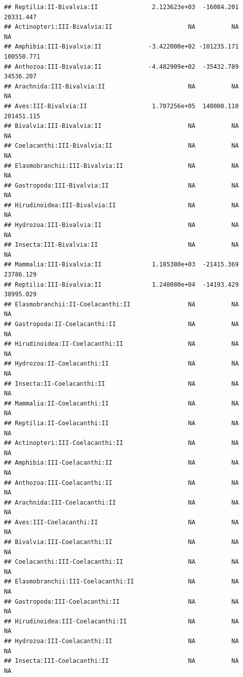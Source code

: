 \documentclass[
  12pt,
]{article}
\begin{document}
\begin{verbatim}
## Reptilia:II-Bivalvia:II               2.123623e+03  -16084.201   20331.447
## Actinopteri:III-Bivalvia:II                     NA          NA          NA
## Amphibia:III-Bivalvia:II             -3.422000e+02 -101235.171  100550.771
## Anthozoa:III-Bivalvia:II             -4.482909e+02  -35432.789   34536.207
## Arachnida:III-Bivalvia:II                       NA          NA          NA
## Aves:III-Bivalvia:II                  1.707256e+05  140000.110  201451.115
## Bivalvia:III-Bivalvia:II                        NA          NA          NA
## Coelacanthi:III-Bivalvia:II                     NA          NA          NA
## Elasmobranchii:III-Bivalvia:II                  NA          NA          NA
## Gastropoda:III-Bivalvia:II                      NA          NA          NA
## Hirudinoidea:III-Bivalvia:II                    NA          NA          NA
## Hydrozoa:III-Bivalvia:II                        NA          NA          NA
## Insecta:III-Bivalvia:II                         NA          NA          NA
## Mammalia:III-Bivalvia:II              1.185380e+03  -21415.369   23786.129
## Reptilia:III-Bivalvia:II              1.240080e+04  -14193.429   38995.029
## Elasmobranchii:II-Coelacanthi:II                NA          NA          NA
## Gastropoda:II-Coelacanthi:II                    NA          NA          NA
## Hirudinoidea:II-Coelacanthi:II                  NA          NA          NA
## Hydrozoa:II-Coelacanthi:II                      NA          NA          NA
## Insecta:II-Coelacanthi:II                       NA          NA          NA
## Mammalia:II-Coelacanthi:II                      NA          NA          NA
## Reptilia:II-Coelacanthi:II                      NA          NA          NA
## Actinopteri:III-Coelacanthi:II                  NA          NA          NA
## Amphibia:III-Coelacanthi:II                     NA          NA          NA
## Anthozoa:III-Coelacanthi:II                     NA          NA          NA
## Arachnida:III-Coelacanthi:II                    NA          NA          NA
## Aves:III-Coelacanthi:II                         NA          NA          NA
## Bivalvia:III-Coelacanthi:II                     NA          NA          NA
## Coelacanthi:III-Coelacanthi:II                  NA          NA          NA
## Elasmobranchii:III-Coelacanthi:II               NA          NA          NA
## Gastropoda:III-Coelacanthi:II                   NA          NA          NA
## Hirudinoidea:III-Coelacanthi:II                 NA          NA          NA
## Hydrozoa:III-Coelacanthi:II                     NA          NA          NA
## Insecta:III-Coelacanthi:II                      NA          NA          NA

\end{verbatim}
\end{document}
